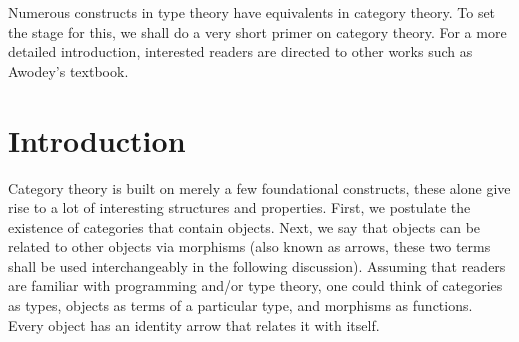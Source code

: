\documentclass[12pt,twoside,maitrise]{dms}
\theoremstyle{definition}
\numberwithin{equation}{section}
\numberwithin{table}{chapter}
\numberwithin{figure}{chapter}
\begin{document}

Numerous constructs in type theory have equivalents in category theory. To set
the stage for this, we shall do a very short primer on category theory. For a
more detailed introduction, interested readers are directed to other works such
as Awodey's textbook\cite{awodey-cattheory}.

\section{Introduction}
Category theory is built on merely a few foundational constructs, these alone
give rise to a lot of interesting structures and properties. First, we postulate
the existence of categories that contain objects. Next, we say that objects can
be related to other objects via morphisms (also known as arrows, these two terms
shall be used interchangeably in the following discussion). Assuming that
readers are familiar with programming and/or type theory, one could think of
categories as types, objects as terms of a particular type, and morphisms as
functions. Every object has an identity arrow that relates it with itself.
\end{document}
